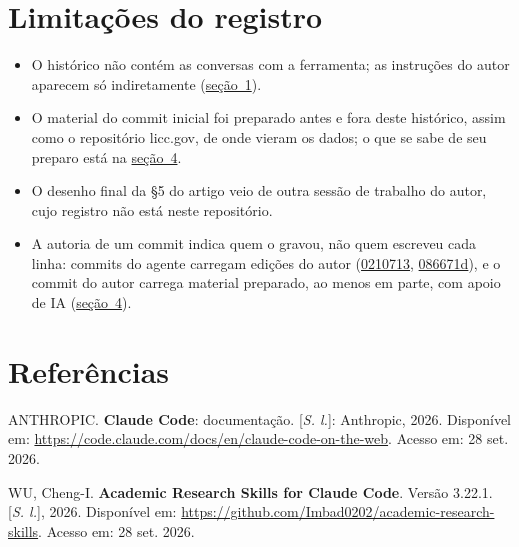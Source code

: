 \documentclass[12pt,a4paper]{article}
\providecommand{\tightlist}{\setlength{\itemsep}{1.5pt}\setlength{\parskip}{0pt}}
\newenvironment{referencias}{\raggedright\setlength{\parindent}{0pt}\setlength{\parskip}{0.5\baselineskip}}{\par}
\begin{document}
\section{Limitações do registro}\label{secao-7}

\begin{itemize}
\tightlist
\item
  O histórico não contém as conversas com a ferramenta; as instruções do autor aparecem só
  indiretamente (\hyperref[secao-1]{seção~1}).
\item
  O material do commit inicial foi preparado antes e fora deste histórico, assim como o repositório
  licc.gov, de onde vieram os dados; o que se sabe de seu preparo está na \hyperref[secao-4]{seção~4}.
\item
  O desenho final da §5 do artigo veio de outra sessão de trabalho do autor, cujo registro não está
  neste repositório.
\item
  A autoria de um commit indica quem o gravou, não quem escreveu cada linha: commits do agente
  carregam edições do autor
  (\href{https://github.com/fcarva/aval-pol/commit/0210713f9418cf40de786c2cc5abe2a349b0c755}{0210713},
  \href{https://github.com/fcarva/aval-pol/commit/086671d829e2db4a2f4980c87108a6ed5e34bb36}{086671d}),
  e o commit do autor carrega material preparado, ao menos em parte, com apoio de IA (\hyperref[secao-4]{seção~4}).
\end{itemize}

\section*{Referências}
\begin{referencias}
\protect{}\label{ref-anthropic-1}{}ANTHROPIC. \textbf{Claude Code}: documentação.
{[}\emph{S. l.}{]}: Anthropic, 2026. Disponível em:
\url{https://code.claude.com/docs/en/claude-code-on-the-web}. Acesso em: 28 set. 2026.

\protect{}\label{ref-wu-2}{}WU, Cheng-I. \textbf{Academic Research Skills for Claude
Code}. Versão 3.22.1. {[}\emph{S. l.}{]}, 2026. Disponível em:
\url{https://github.com/Imbad0202/academic-research-skills}. Acesso em: 28 set. 2026.
\end{referencias}
\end{document}
